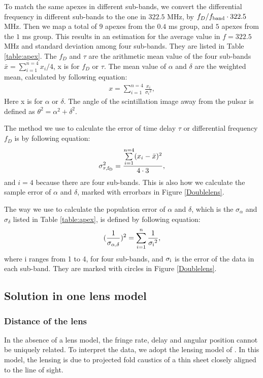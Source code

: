 \documentclass[useAMS,usenatbib]{mn2e}
\begin{document}
To match the same apexes in different sub-bands, we convert the differential frequency in different sub-bands to the one in $322.5$ MHz, by $f_D/f_{\rm band}\cdot322.5$ MHz. Then we map
a total of $9$ apexes from the $0.4$ ms group, and $5$ apexes from the $1$ ms
group. This results in an estimation
for the average value in $f=322.5$ MHz and standard deviation among four sub-bands. They are listed in Table
\ref{table:apex}. The $f_D$ and $\tau$ are the arithmetic mean value of the four sub-bands $\bar{x}={\sum\limits^{n=4}_{i=1}{x_i}}/{4}$, x is for $f_D$ or $\tau$.
The mean value of $\alpha$ and $\delta$ are the weighted mean, calculated by following equation:
\begin{align*}
x=\sum\limits^{n=4}_{i=1}\frac{x_i}{{\sigma_i}^2},
\end{align*}
Here x is for $\alpha$ or $\delta$. The angle of the scintillation image away from the pulsar is defined as ${\theta}^2={\alpha}^2+{\delta}^2$. 

The method we use to calculate the error of time delay $\tau$ or differential frequency $f_D$ is by following equation:
\begin{align*}
{\sigma^2_{\rm \tau, f_D}} = \frac{\sum\limits^{n=4}_{i=1}(x_i-\bar{x})^2}{4\cdot3},
\end{align*}
and $i=4$ because there are four sub-bands. This is also how we calculate the sample error of $\alpha$ and $\delta$, marked with errorbars in Figure \ref{Doublelens}.

The way we use to calculate the population error of $\alpha$ and $\delta$, which is the $\sigma_{\alpha}$ and $\sigma_{\delta}$ listed in Table \ref{table:apex}, is defined by following equation:
\begin{align*}
(\frac{1}{\sigma_{\rm \alpha, \delta}})^2 = \sum\limits^n_{i=1}{\frac{1}{{ \rm \sigma_i}^2}},
\end{align*}
where i ranges from 1 to 4, for four sub-bands, and $\rm \sigma_i$ is the error of the data in each sub-band. They are marked with circles in Figure \ref{Doublelens}.

\subsection{Solution in one lens model}
\subsubsection{Distance of the lens}
In the absence of a lens model, the
fringe rate, delay and angular position cannot be uniquely related. To interpret the data, we adopt the lensing model of
\citep{2014MNRAS.442.3338P}.  In this model, the lensing is due to projected fold caustics of a thin sheet closely aligned to the line of sight. 
\end{document}
